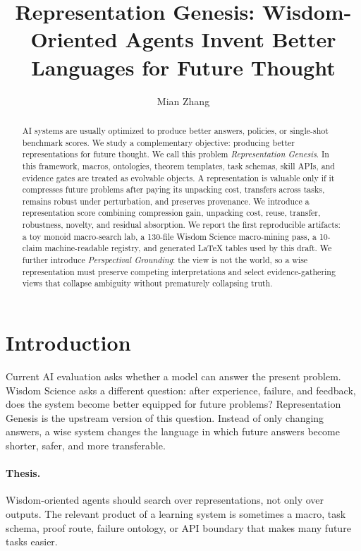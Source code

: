 \documentclass[11pt]{article}
\title{Representation Genesis: Wisdom-Oriented Agents Invent Better Languages for Future Thought}
\author{Mian Zhang}
\date{}
\begin{document}
\maketitle

\begin{abstract}
AI systems are usually optimized to produce better answers, policies, or single-shot benchmark scores.
We study a complementary objective: producing better representations for future thought.
We call this problem \emph{Representation Genesis}.
In this framework, macros, ontologies, theorem templates, task schemas, skill APIs, and evidence gates are treated as evolvable objects.
A representation is valuable only if it compresses future problems after paying its unpacking cost, transfers across tasks, remains robust under perturbation, and preserves provenance.
We introduce a representation score combining compression gain, unpacking cost, reuse, transfer, robustness, novelty, and residual absorption.
We report the first reproducible artifacts: a toy monoid macro-search lab, a 130-file Wisdom Science macro-mining pass, a 10-claim machine-readable registry, and generated LaTeX tables used by this draft.
We further introduce \emph{Perspectival Grounding}: the view is not the world, so a wise representation must preserve competing interpretations and select evidence-gathering views that collapse ambiguity without prematurely collapsing truth.
\end{abstract}

\section{Introduction}

Current AI evaluation asks whether a model can answer the present problem.
Wisdom Science asks a different question: after experience, failure, and feedback, does the system become better equipped for future problems?
Representation Genesis is the upstream version of this question.
Instead of only changing answers, a wise system changes the language in which future answers become shorter, safer, and more transferable.

\paragraph{Thesis.}
Wisdom-oriented agents should search over representations, not only over outputs.
The relevant product of a learning system is sometimes a macro, task schema, proof route, failure ontology, or API boundary that makes many future tasks easier.
\end{document}
